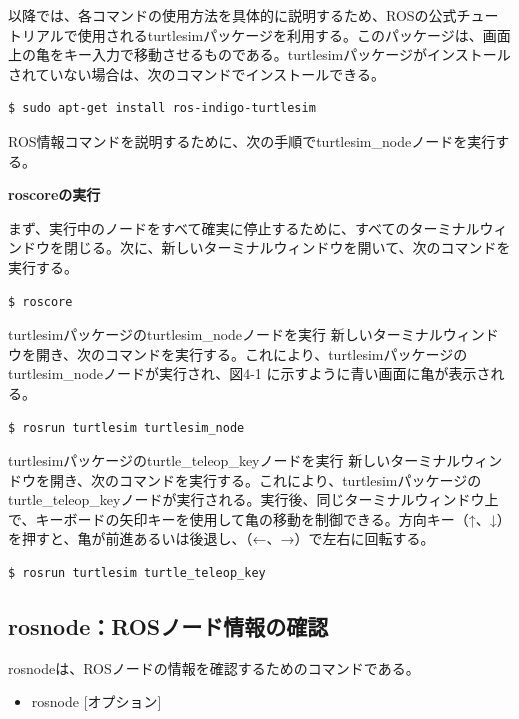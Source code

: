 以降では、各コマンドの使用方法を具体的に説明するため、ROSの公式チュートリアルで使用されるturtlesimパッケージを利用する。このパッケージは、画面上の亀をキー入力で移動させるものである。turtlesimパッケージがインストールされていない場合は、次のコマンドでインストールできる。

\begin{lstlisting}[language=ROS]
$ sudo apt-get install ros-indigo-turtlesim
\end{lstlisting}

ROS情報コマンドを説明するために、次の手順でturtlesim\_nodeノードを実行する。

\textbf{roscoreの実行}

まず、実行中のノードをすべて確実に停止するために、すべてのターミナルウィンドウを閉じる。次に、新しいターミナルウィンドウを開いて、次のコマンドを実行する。

\begin{lstlisting}[language=ROS]
$ roscore
\end{lstlisting}

turtlesimパッケージのturtlesim\_nodeノードを実行
新しいターミナルウィンドウを開き、次のコマンドを実行する。これにより、turtlesimパッケージのturtlesim\_nodeノードが実行され、図4-1 に示すように青い画面に亀が表示される。

\begin{lstlisting}[language=ROS]
$ rosrun turtlesim turtlesim_node
\end{lstlisting}

turtlesimパッケージのturtle\_teleop\_keyノードを実行
新しいターミナルウィンドウを開き、次のコマンドを実行する。これにより、turtlesimパッケージのturtle\_teleop\_keyノードが実行される。実行後、同じターミナルウィンドウ上で、キーボードの矢印キーを使用して亀の移動を制御できる。方向キー（↑、↓）を押すと、亀が前進あるいは後退し、（←、→）で左右に回転する。

\begin{lstlisting}[language=ROS]
$ rosrun turtlesim turtle_teleop_key
\end{lstlisting}

\subsection{rosnode：ROSノード情報の確認}

rosnodeは、ROSノードの情報を確認するためのコマンドである。

\begin{itemize}
\item  rosnode [オプション]
\end{itemize}


